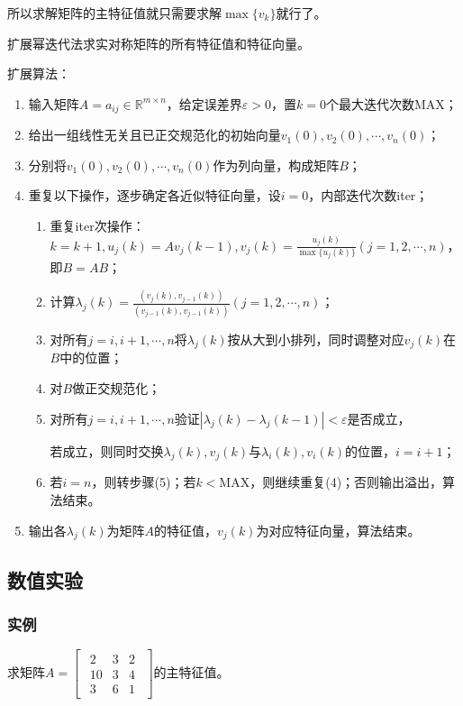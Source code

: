 \documentclass[UTF8]{ctexart}
\begin{document}
    所以求解矩阵的主特征值就只需要求解$\max\{v_k\}$就行了。

    扩展幂迭代法求实对称矩阵的所有特征值和特征向量。

    扩展算法：
    \begin{enumerate}[label=(\arabic*),itemindent=2em,fullwidth]
        \item 输入矩阵$A=a_{ij}\in\mathbb{R}^{m\times n}$，给定误差界$\varepsilon>0$，置$k=0$个最大迭代次数MAX；
        \item 给出一组线性无关且已正交规范化的初始向量$v_1(0),v_2(0),\cdots,v_n(0)$；
        \item 分别将$v_1(0),v_2(0),\cdots,v_n(0)$作为列向量，构成矩阵$B$；
        \item 重复以下操作，逐步确定各近似特征向量，设$i=0$，内部迭代次数iter；
        \begin{enumerate}[label=\roman*.,itemindent=4em,fullwidth]
            \item 重复iter次操作：$k=k+1,u_j(k)=Av_j(k-1),v_j(k)=\frac{u_j(k)}{\max\{u_j(k)\}}(j=1,2,\cdots,n)$，即$B=AB$；
            \item 计算$\displaystyle \lambda_j(k)=\frac{(v_j(k),v_{j-1}(k))}{(v_{j-1}(k),v_{j-1}(k))}(j=1,2,\cdots,n)$；
            \item 对所有$j=i,i+1,\cdots,n$将$\lambda_j(k)$按从大到小排列，同时调整对应$v_j(k)$在$B$中的位置；
            \item 对$B$做正交规范化；
            \item 对所有$j=i,i+1,\cdots,n$验证$|\lambda_j(k)-\lambda_j(k-1)|<\varepsilon$是否成立，\par\setlength\parindent{5.5em}若成立，则同时交换$\lambda_j(k),v_j(k)$与$\lambda_i(k),v_i(k)$的位置，$i=i+1$；
            \item 若$i=n$，则转步骤(5)；若$k<$MAX，则继续重复(4)；否则输出溢出，算法结束。
        \end{enumerate}
        \item 输出各$\lambda_j(k)$为矩阵$A$的特征值，$v_j(k)$为对应特征向量，算法结束。
    \end{enumerate}
    \subsection{数值实验}
    \subsubsection{实例}
    求矩阵$A=\left[\begin{array}{ccc}
        \begin{matrix}
            2 & 3 & 2\\10 & 3 & 4\\3 & 6 & 1
        \end{matrix}
    \end{array}\right]$的主特征值。
\end{document}
